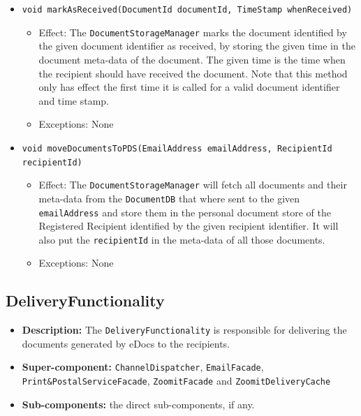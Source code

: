 \documentclass[a4paper,10pt]{article}
\begin{document}
\begin{itemize}
\begin{itemize}
    
        \item \texttt{void markAsReceived(DocumentId documentId, TimeStamp whenReceived)}
        \begin{itemize}
            \item Effect: The \texttt{DocumentStorageManager} marks the document identified by the given document identifier as received, by storing the given time in the document meta-data of the document. The given time is the time when the recipient should have received the document. Note that this method only has effect the first time it is called for a valid document identifier and time stamp.
            \item Exceptions: None
        \end{itemize}
        
        \item \texttt{void moveDocumentsToPDS(EmailAddress emailAddress, RecipientId recipientId)}
        \begin{itemize}
            \item Effect: The \texttt{DocumentStorageManager} will fetch all documents and their meta-data from the \texttt{DocumentDB} that where sent to the given \texttt{emailAddress} and store them in the personal document store of the Registered Recipient identified by the given recipient identifier. It will also put the \texttt{recipientId} in the meta-data of all those documents.
            \item Exceptions: None
        \end{itemize}        
        
    \end{itemize}
\end{itemize}

\subsection{DeliveryFunctionality}
\begin{itemize}
    \item \textbf{Description:} The \texttt{DeliveryFunctionality} is responsible  for delivering the documents generated by eDocs to the recipients. 
    \item \textbf{Super-component:} \texttt{ChannelDispatcher}, \texttt{EmailFacade}, \texttt{Print\&PostalServiceFacade}, \texttt{ZoomitFacade} and \texttt{ZoomitDeliveryCache}
    \item \textbf{Sub-components:} the direct sub-components, if any.
\end{itemize}
\end{document}
